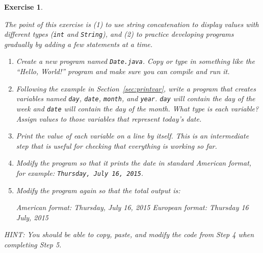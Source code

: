 \documentclass[12pt]{book}
\theoremstyle{exercise}
\newtheorem{exercise}{Exercise}[chapter]
\newcommand{\java}[1]{\lstinline{#1}} %
\begin{document}
\begin{exercise}
\label{ex:date}

The point of this exercise is (1) to use string concatenation to display values with different types (\java{int} and \java{String}), and (2) to practice developing programs gradually by adding a few statements at a time.

\begin{enumerate}

\item Create a new program named {\tt Date.java}.
Copy or type in something like the ``Hello, World!'' program and make sure you can compile and run it.

\item Following the example in Section~\ref{sec:printvar}, write a program that creates variables named \java{day}, \java{date}, \java{month}, and \java{year}.
\java{day} will contain the day of the week and \java{date} will contain the day of the month.
What type is each variable?
Assign values to those variables that represent today's date.

\item Print the value of each variable on a line by itself.
This is an intermediate step that is useful for checking that everything is working so far.

\item Modify the program so that it prints the date in standard American format, for example: {\tt Thursday, July 16, 2015}.

\item Modify the program again so that the total output is:

\begin{stdout}
American format:
Thursday, July 16, 2015
European format:
Thursday 16 July, 2015
\end{stdout}

\end{enumerate}

HINT: You should be able to copy, paste, and modify the code from Step 4 when completing Step 5.

\end{exercise}
\end{document}
